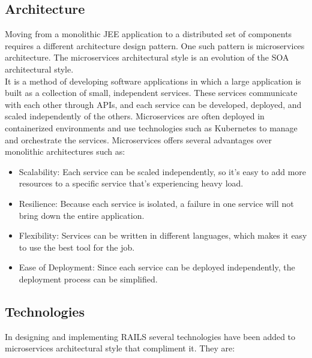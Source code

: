 \subsection{Architecture}
Moving from a monolithic \ac{JEE} application to a distributed set of components requires a different architecture design pattern. One such pattern is microservices architecture. The microservices architectural style is an evolution of the \ac{SOA} architectural style.\vspace{5mm} \\
It is a method of developing software applications in which a large application is built as a collection of small, independent services. These services communicate with each other through APIs, and each service can be developed, deployed, and scaled independently of the others. Microservices are often deployed in containerized environments and use technologies such as Kubernetes to manage and orchestrate the services. Microservices offers several advantages over monolithic architectures such as:
\begin{itemize}
\item Scalability: Each service can be scaled independently, so it's easy to add more resources to a specific service that's experiencing heavy load.
\item Resilience: Because each service is isolated, a failure in one service will not bring down the entire application.
\item Flexibility: Services can be written in different languages, which makes it easy to use the best tool for the job.
\item Ease of Deployment: Since each service can be deployed independently, the deployment process can be simplified.
\end{itemize}
\subsection{Technologies}\label{technologies}
In designing and implementing \ac{RAILS} several technologies have been added to microservices architectural style that compliment it. They are:
